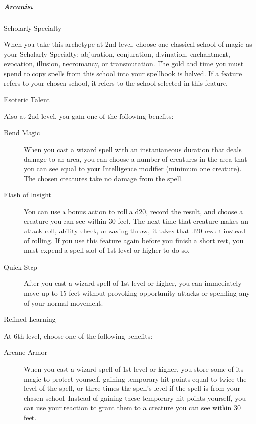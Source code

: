 \subparagraph{Arcanist}\label{wizard-subclass-arcanist}

Scholarly Specialty

When you take this archetype at 2nd level, choose one classical school
of magic as your Scholarly Specialty: abjuration, conjuration,
divination, enchantment, evocation, illusion, necromancy, or
transmutation. The gold and time you must spend to copy spells from this
school into your spellbook is halved. If a feature refers to your chosen
school, it refers to the school selected in this feature.

Esoteric Talent

Also at 2nd level, you gain one of the following benefits:

\begin{description}
\item[Bend Magic]
When you cast a wizard spell with an instantaneous duration that deals
damage to an area, you can choose a number of creatures in the area that
you can see equal to your Intelligence modifier (minimum one creature).
The chosen creatures take no damage from the spell.
\end{description}

\begin{description}
\item[Flash of Insight]
You can use a bonus action to roll a d20, record the result, and choose
a creature you can see within 30 feet. The next time that creature makes
an attack roll, ability check, or saving throw, it takes that d20 result
instead of rolling. If you use this feature again before you finish a
short rest, you must expend a spell slot of 1st-level or higher to do
so.
\end{description}

\begin{description}
\item[Quick Step]
After you cast a wizard spell of 1st-level or higher, you can
immediately move up to 15 feet without provoking opportunity attacks or
spending any of your normal movement.
\end{description}

Refined Learning

At 6th level, choose one of the following benefits:

\begin{description}
\item[Arcane Armor]
When you cast a wizard spell of 1st-level or higher, you store some of
its magic to protect yourself, gaining temporary hit points equal to
twice the level of the spell, or three times the spell's level if the
spell is from your chosen school. Instead of gaining these temporary hit
points yourself, you can use your reaction to grant them to a creature
you can see within 30 feet.
\end{description}

